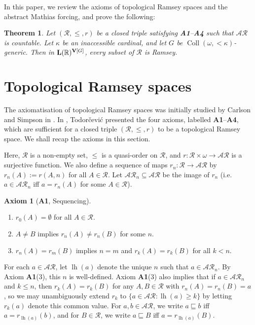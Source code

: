 \documentclass[11pt,reqno]{amsart}
\theoremstyle{plain}
\numberwithin{equation}{section}
\newtheorem{theorem}{Theorem}[section]
\theoremstyle{definition}
\newtheorem*{axiom}{Axiom}
\newcommand{\func}{\operatorname}
\newcommand{\R}{\mathbb{R}}
\newcommand{\cal}{\mathcal}
\renewcommand{\bf}{\mathbf}
\newcommand{\Coll}{\func{Coll}}
\newcommand{\V}{\bf{V}}
\newcommand{\lh}{\func{lh}}
\DeclareRobustCommand{\L}{\ifmmode\mathbf{L}\else\strokeL\fi}
\begin{document}
In this paper, we review the axioms of topological Ramsey spaces and the abstract Mathias forcing, and prove the following:

\begin{theorem}
\label{thm:main}
    Let $(\cal{R},\leq,r)$ be a closed triple satisfying \textbf{A1}--\textbf{A4} such that $\cal{AR}$ is countable. Let $\kappa$ be an inaccessible cardinal, and let $G$ be $\Coll(\omega,{<}\kappa)$-generic. Then in $\L(\R)^{\V[G]}$, every subset of $\cal{R}$ is Ramsey.
\end{theorem}

\section{Topological Ramsey spaces}
\label{sec:TRS}
The axiomatisation of topological Ramsey spaces was initially studied by Carlson and Simpson in \cite{CS90}. In \cite{T10}, Todor\v{c}evi\'{c} presented the four axioms, labelled \textbf{A1}--\textbf{A4}, which are sufficient for a closed triple $(\cal{R},\leq,r)$ to be a topological Ramsey space. We shall recap the axioms in this section.

Here, $\cal{R}$ is a non-empty set, $\leq$ is a quasi-order on $\cal{R}$, and $r : \cal{R} \times \omega \to \cal{AR}$ is a surjective function. We also define a sequence of maps $r_n : \cal{R} \to \cal{AR}$ by $r_n(A) := r(A,n)$ for all $A \in \cal{R}$. Let $\cal{AR}_n \subseteq \cal{AR}$ be the image of $r_n$ (i.e. $a \in \cal{AR}_n$ iff $a = r_n(A)$ for some $A \in \cal{R}$).

\begin{axiom}[\textbf{A1}, Sequencing]
\hfill
    \begin{enumerate}[label=(\arabic*)]
        \item $r_0(A) = \emptyset$ for all $A \in \cal{R}$.

        \item $A \neq B$ implies $r_n(A) \neq r_n(B)$ for some $n$.

        \item $r_n(A) = r_m(B)$ implies $n = m$ and $r_k(A) = r_k(B)$ for all $k < n$.
    \end{enumerate}
\end{axiom}

For each $a \in \cal{AR}$, let $\lh(a)$ denote the unique $n$ such that $a \in \cal{AR}_n$. By Axiom \textbf{A1}(3), this $n$ is well-defined. Axiom \textbf{A1}(3) also implies that if $a \in \cal{AR}_n$ and $k \leq n$, then $r_k(A) = r_k(B)$ for any $A,B \in \cal{R}$ with $r_n(A) = r_n(B) = a$, so we may unambiguously extend $r_k$ to $\{a \in \cal{AR} : \lh(a) \geq k\}$ by letting $r_k(a)$ denote this common value. For $a,b \in \cal{AR}$, we write $a \sqsubseteq b$ iff $a = r_{\lh(a)}(b)$, and for $B \in \cal{R}$, we write $a \sqsubseteq B$ iff $a = r_{\lh(a)}(B)$.
\end{document}
